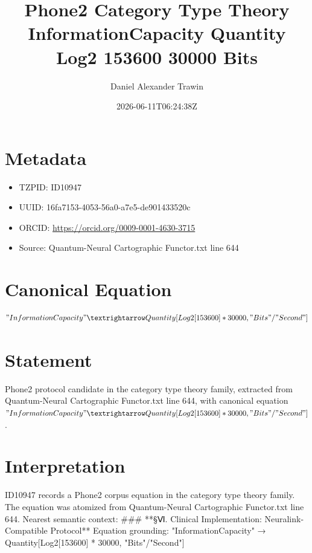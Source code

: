 \documentclass[11pt]{article}
\title{Phone2 Category Type Theory InformationCapacity Quantity Log2 153600 30000 Bits}
\author{Daniel Alexander Trawin}
\date{2026-06-11T06:24:38Z}
\begin{document}
\maketitle
\section*{Metadata}
\begin{itemize}
\item TZPID: ID10947
\item UUID: 16fa7153-4053-56a0-a7e5-de901433520c
\item ORCID: \url{https://orcid.org/0009-0001-4630-3715}
\item Source: Quantum-Neural Cartographic Functor.txt line 644
\end{itemize}
\section*{Canonical Equation}
\[
"InformationCapacity" → Quantity[Log2[153600] * 30000, "Bits"/"Second"]
\]
\section*{Statement}
Phone2 protocol candidate in the category type theory family, extracted from Quantum-Neural Cartographic Functor.txt line 644, with canonical equation $"InformationCapacity" → Quantity[Log2[153600] * 30000, "Bits"/"Second"]$.
\section*{Interpretation}
ID10947 records a Phone2 corpus equation in the category type theory family. The equation was atomized from Quantum-Neural Cartographic Functor.txt line 644. Nearest semantic context: ### **§Ⅵ. Clinical Implementation: Neuralink-Compatible Protocol** Equation grounding: "InformationCapacity" → Quantity[Log2[153600] * 30000, "Bits"/"Second"]
\end{document}
